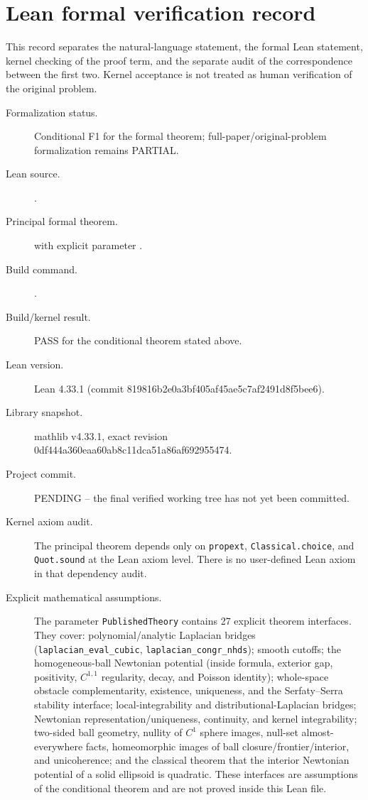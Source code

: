 \documentclass[11pt]{article}
\theoremstyle{definition}
\theoremstyle{remark}
\newcommand{\1}{\mathbf{1}}
\begin{document}
\section*{Lean formal verification record}

\begingroup\small\sloppy
This record separates the natural-language statement, the formal Lean statement, kernel checking of the proof term, and the separate audit of the correspondence between the first two. Kernel acceptance is not treated as human verification of the original problem.

\begin{description}
\item[Formalization status.] Conditional F1 for the formal theorem; full-paper/original-problem formalization remains PARTIAL.
\item[Lean source.] \texttt{}.
\item[Principal formal theorem.] \texttt{} with explicit parameter \texttt{}.
\item[Build command.] \texttt{}.
\item[Build/kernel result.] PASS for the conditional theorem stated above.
\item[Lean version.] Lean 4.33.1 (commit 819816b2e0a3bf405af45ae5c7af2491d8f5bee6).
\item[Library snapshot.] mathlib v4.33.1, exact revision 0df444a360eaa60ab8c11dca51a86af692955474.
\item[Project commit.] PENDING -- the final verified working tree has not yet been committed.
\item[Kernel axiom audit.] The principal theorem depends only on \texttt{propext}, \texttt{Classical.choice}, and \texttt{Quot.sound} at the Lean axiom level. There is no user-defined Lean axiom in that dependency audit.
\item[Explicit mathematical assumptions.] The parameter \texttt{PublishedTheory} contains 27 explicit theorem interfaces. They cover: polynomial/analytic Laplacian bridges (\texttt{laplacian\_eval\_cubic}, \texttt{laplacian\_congr\_nhds}); smooth cutoffs; the homogeneous-ball Newtonian potential (inside formula, exterior gap, positivity, $C^{1,1}$ regularity, decay, and Poisson identity); whole-space obstacle complementarity, existence, uniqueness, and the Serfaty--Serra stability interface; local-integrability and distributional-Laplacian bridges; Newtonian representation/uniqueness, continuity, and kernel integrability; two-sided ball geometry, nullity of $C^1$ sphere images, null-set almost-everywhere facts, homeomorphic images of ball closure/frontier/interior, and unicoherence; and the classical theorem that the interior Newtonian potential of a solid ellipsoid is quadratic. These interfaces are assumptions of the conditional theorem and are not proved inside this Lean file.

\end{description}
\end{document}

